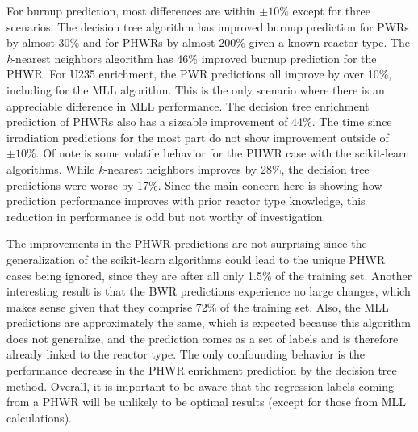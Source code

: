 For burnup prediction, most differences are within $\pm10\%$ except for three
scenarios.  The decision tree algorithm has improved burnup prediction for
\gls{PWR}s by almost 30\% and for \gls{PHWR}s by almost 200\% given a known
reactor type.  The \textit{k}-nearest neighbors algorithm has 46\% improved
burnup prediction for the \gls{PHWR}. For \gls{U235} enrichment, the \gls{PWR}
predictions all improve by over 10\%, including for the \gls{MLL} algorithm.
This is the only scenario where there is an appreciable difference in \gls{MLL}
performance. The decision tree enrichment prediction of \gls{PHWR}s also has a
sizeable improvement of 44\%.  The time since irradiation predictions for the
most part do not show improvement outside of $\pm10\%$. Of note is some
volatile behavior for the \gls{PHWR} case with the scikit-learn algorithms.
While \textit{k}-nearest neighbors improves by 28\%, the decision tree
predictions were worse by 17\%. Since the main concern here is showing how
prediction performance improves with prior reactor type knowledge, this
reduction in performance is odd but not worthy of investigation. 

The improvements in the \gls{PHWR} predictions are not surprising since the
generalization of the scikit-learn algorithms could lead to the unique
\gls{PHWR} cases being ignored, since they are after all only 1.5\% of the
training set.  Another interesting result is that the \gls{BWR} predictions
experience no large changes, which makes sense given that they comprise 72\% of
the training set. Also, the \gls{MLL} predictions are approximately the same,
which is expected because this algorithm does not generalize, and the
prediction comes as a set of labels and is therefore already linked to the
reactor type.  The only confounding behavior is the performance decrease in the
\gls{PHWR} enrichment prediction by the decision tree method.  Overall, it is
important to be aware that the regression labels coming from a \gls{PHWR} will
be unlikely to be optimal results (except for those from \gls{MLL}
calculations).

